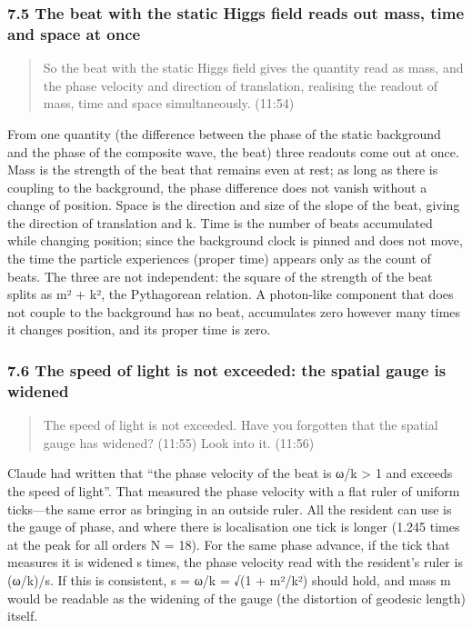 \documentclass[
  a4paper,
]{article}
\begin{document}
\subsubsection{7.5 The beat with the static Higgs field reads out mass,
time and space at
once}\label{the-beat-with-the-static-higgs-field-reads-out-mass-time-and-space-at-once}

\begin{quote}
So the beat with the static Higgs field gives the quantity read as mass,
and the phase velocity and direction of translation, realising the
readout of mass, time and space simultaneously. (11:54)
\end{quote}

From one quantity (the difference between the phase of the static
background and the phase of the composite wave, the beat) three readouts
come out at once. Mass is the strength of the beat that remains even at
rest; as long as there is coupling to the background, the phase
difference does not vanish without a change of position. Space is the
direction and size of the slope of the beat, giving the direction of
translation and k. Time is the number of beats accumulated while
changing position; since the background clock is pinned and does not
move, the time the particle experiences (proper time) appears only as
the count of beats. The three are not independent: the square of the
strength of the beat splits as m² + k², the Pythagorean relation. A
photon-like component that does not couple to the background has no
beat, accumulates zero however many times it changes position, and its
proper time is zero.

\subsubsection{7.6 The speed of light is not exceeded: the spatial gauge
is
widened}\label{the-speed-of-light-is-not-exceeded-the-spatial-gauge-is-widened}

\begin{quote}
The speed of light is not exceeded. Have you forgotten that the spatial
gauge has widened? (11:55) Look into it. (11:56)
\end{quote}

Claude had written that ``the phase velocity of the beat is ω/k
\textgreater{} 1 and exceeds the speed of light''. That measured the
phase velocity with a flat ruler of uniform ticks---the same error as
bringing in an outside ruler. All the resident can use is the gauge of
phase, and where there is localisation one tick is longer (1.245 times
at the peak for all orders N = 18). For the same phase advance, if the
tick that measures it is widened s times, the phase velocity read with
the resident's ruler is (ω/k)/s. If this is consistent, s = ω/k = √(1 +
m²/k²) should hold, and mass m would be readable as the widening of the
gauge (the distortion of geodesic length) itself.
\end{document}
